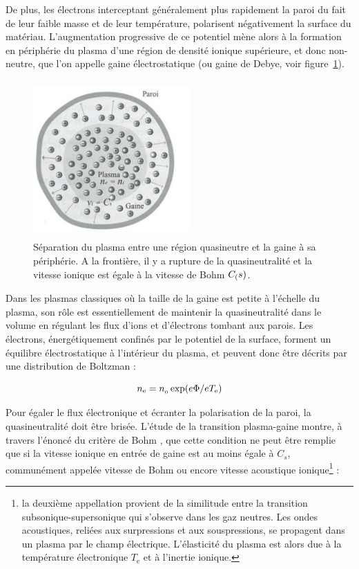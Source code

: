 \begin{refsection}
De plus, les électrons interceptant généralement
plus rapidement la paroi du fait de leur faible masse et de leur température,
polarisent négativement la surface du matériau.
L'augmentation progressive de ce potentiel mène alors à la formation en
périphérie du plasma d'une région de densité ionique supérieure, et donc
non-neutre, que l'on appelle gaine électrostatique (ou gaine de Debye, voir
figure~\ref{1-gaine}).

\begin{figure}[htbp]
\centering
\includegraphics[height=60mm,width=60mm]{figures/sheath1.jpg}{\caption{Séparation
du plasma entre une région quasineutre et la gaine à sa
périphérie. A la frontière, il y a rupture de la quasineutralité et la vitesse
ionique est égale à la vitesse de Bohm
$C_\text(s)$\parencite{Rax}.}\label{1-gaine}}
\end{figure}

Dans les plasmas classiques où la taille de la gaine est petite
à l'échelle du plasma, son rôle est essentiellement de
maintenir la quasineutralité dans le volume en régulant les flux d'ions et
d'électrons tombant aux parois. Les électrons, énergétiquement confinés par le
potentiel de la surface, forment un équilibre électrostatique à l'intérieur du
plasma, et peuvent donc être décrits par une distribution de Boltzman :

\begin{equation}
	n_\text{e}=n_{_{0}}\exp(e\Phi/eT_\text{e})
\end{equation}

Pour égaler le flux électronique et écranter la polarisation de la paroi, la
quasineutralité doit être brisée. L'étude de la transition plasma-gaine montre,
à travers l'énoncé du critère de Bohm \parencite{Stangeby}, que
cette condition ne peut être remplie que si la vitesse ionique en entrée de
gaine est au moins égale à $C_s$, communément appelée vitesse de Bohm ou encore
vitesse acoustique ionique\footnote{la deuxième appellation provient de la similitude entre la
transition subsonique-supersonique qui s'observe dans les gaz neutres. Les
ondes acoustiques, reliées aux surpressions et aux souspressions, se propagent
dans un plasma par le champ électrique. L'élasticité du plasma est alors due à
la température électronique $T_\text{e}$ et à l'inertie ionique.} :


\end{refsection}
